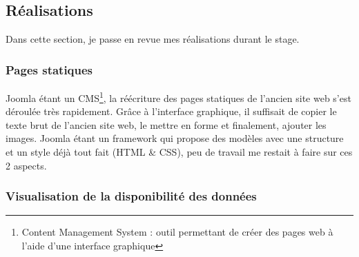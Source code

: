 \documentclass[11pt]{article}
\begin{document}
\subsection{Réalisations}

Dans cette section, je passe en revue mes réalisations durant le stage.

\subsubsection{Pages statiques}
Joomla étant un CMS\footnote{Content Management System : outil permettant de créer des pages web à l'aide d'une interface graphique}, la réécriture des pages statiques de l'ancien site web s'est déroulée très rapidement.
Grâce à l'interface graphique, il suffisait de copier le texte brut de l'ancien site web, le mettre en forme et finalement, ajouter les images.
Joomla étant un framework qui propose des modèles avec une structure et un style déjà tout fait (HTML \& CSS), peu de travail me restait à faire sur ces 2 aspects.

\subsubsection{Visualisation de la disponibilité des données}
\end{document}
